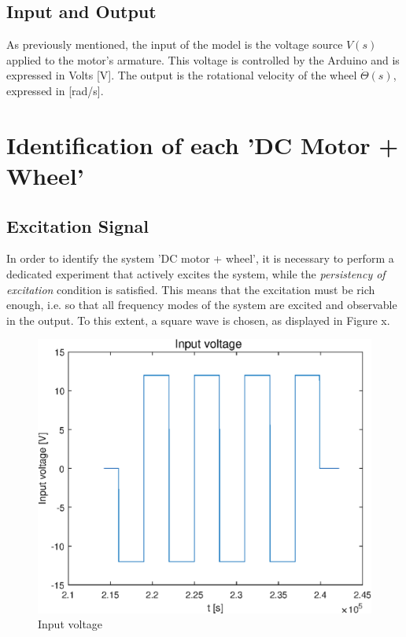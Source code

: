 \documentclass[a4paper,kul]{kulakarticle} %
\begin{document}
\subsection{Input and Output}
As previously mentioned, the input of the model is the voltage source $V(s)$ applied to the motor's armature. This voltage is controlled by the Arduino and is expressed in Volts [V]. The output is the rotational velocity of the wheel  $\dot{\Theta}(s)$, expressed in [rad/s].


\section{Identification of each 'DC Motor + Wheel'}
\subsection{Excitation Signal}
In order to identify the system 'DC motor + wheel', it is necessary to perform a dedicated experiment that actively excites the system, while the \textit{persistency of excitation} condition is satisfied. This means that the excitation must be rich enough, i.e. so that all frequency modes of the system are excited and observable in the output. To this extent, a square wave is chosen, as displayed in Figure x.

\begin{figure}[htp!]
	\centering
	\includegraphics[width=.7\linewidth]{input_voltage.eps}
	\caption{Input voltage}
	\label{fig:input_voltage}
\end{figure}
\end{document}
